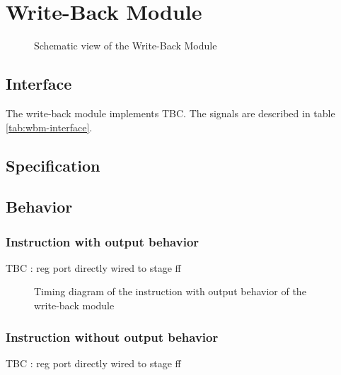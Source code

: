 \section{Write-Back Module}

\begin{figure}[h!]
    \centering
    
    \caption{Schematic view of the Write-Back Module}
    \label{fig:wbm}
\end{figure}

\subsection{Interface}

\begin{content}
The write-back module implements TBC. The signals are described in table \ref{tab:wbm-interface}. 
\end{content}



\subsection{Specification}

\subsection{Behavior}

\subsubsection{Instruction with output behavior}

\begin{content}
  TBC : reg port directly wired to stage ff
\end{content}

\begin{figure}[H]
    \centering
    
    \caption{Timing diagram of the instruction with output behavior of the write-back module}
    \label{fig:wbm-behavior-instruction-with-output}
\end{figure}

\subsubsection{Instruction without output behavior}

\begin{content}
  TBC : reg port directly wired to stage ff
\end{content}

